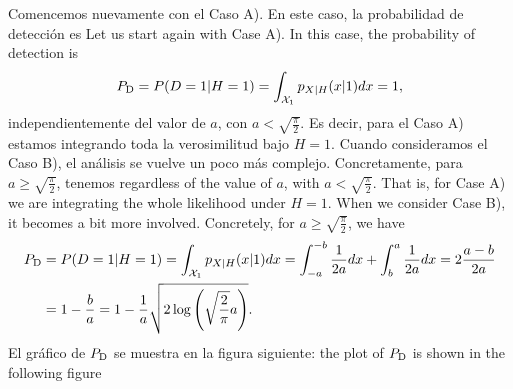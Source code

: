 \begin{parts}
\begin{solution}
\ifspanish Comencemos nuevamente con el Caso A). En este caso, la probabilidad de detección es
\else Let us start again with Case A). In this case, the probability of detection is \fi
  \begin{equation*}
    P_{\text{D}} = P(D = 1 | H = 1) = \int_{\mathcal{X}_1} p_{X | H}(x | 1) d x = 1,
  \end{equation*}
\ifspanish
independientemente del valor de $a$, con $a < \sqrt{\frac{\pi}{2}}$. Es decir, para el Caso A) estamos integrando toda la verosimilitud bajo $H = 1$. Cuando consideramos el Caso B), el análisis se vuelve un poco más complejo. Concretamente, para $a \geq \sqrt{\frac{\pi}{2}}$, tenemos
\else
regardless of the value of $a$, with $a < \sqrt{\frac{\pi}{2}}$. That is, for Case A) we are integrating the whole likelihood under $H = 1$. When we consider Case B), it becomes a bit more involved. Concretely, for $a \geq \sqrt{\frac{\pi}{2}}$, we have
\fi
\begin{align*}
P_{\text{D}} &= P(D = 1 | H = 1) = \int_{\mathcal{X}_1} p_{X | H}(x | 1) d x 
       = \int_{-a}^{-b} \frac{1}{2a} dx + \int_{b}^{a} \frac{1}{2a} dx = 2 \frac{a - b}{2 a} \\ 
      &= 1 - \frac{b}{a} = 1 - \frac{1}{a} \sqrt{2 \log \left(\sqrt{\frac{2}{\pi}} a\right)}.
\end{align*}
\ifspanish 
El gráfico de $P_{\text{D}}$ se muestra en la figura siguiente:
\else the plot of $P_{\text{D}}$ is shown in the following figure
\fi
\begin{center}
	\end{center}
\end{solution}


\end{parts}
